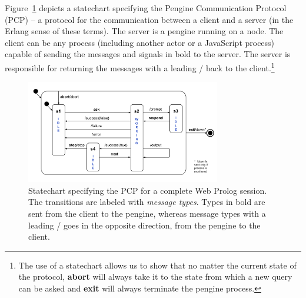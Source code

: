 \documentclass{tlp}
\begin{document}

Figure~\ref{fig:statechart} depicts a statechart specifying the Pengine Communication Protocol (PCP) -- a protocol for the communication between a client and a server (in the Erlang sense of these terms). The server is a pengine running on a node. The client can be any process (including another actor or a JavaScript process) capable of sending the messages and signals in bold to the server. The server is responsible for returning the messages with a leading / back to the client.\footnote{The use of a statechart allows us to show that no matter the current state of the protocol, \textbf{abort} will always take it to the state from which a new query can be asked and \textbf{exit} will always terminate the pengine process.}




\begin{figure}[h]
    \centering
	\includegraphics[width=8.5cm]{statechart}
    \caption{Statechart specifying the PCP for a complete Web Prolog session. The transitions are labeled with \textit{message types}. Types in bold are sent from the client to the pengine, whereas message types with a leading / goes in the opposite direction, from the pengine to the client.}
    \label{fig:statechart}
\end{figure}
\end{document}
